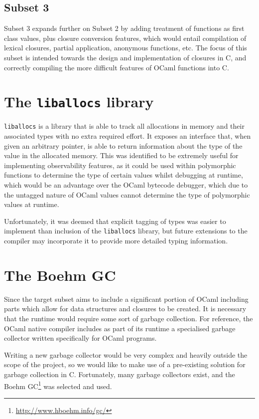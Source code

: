 \subsection{Subset 3}

Subset 3 expands further on Subset 2 by adding treatment of functions as first
class values, plus closure conversion features, which would entail compilation
of lexical closures, partial application, anonymous functions, etc. The focus of
this subset is intended towards the design and implementation of closures in C,
and correctly compiling the more difficult features of OCaml functions into C.

\section{The \texttt{liballocs} library}

\texttt{liballocs}\cite{liballocs} is a library that is able to track all
allocations in memory and their associated types with no extra required effort.
It exposes an interface that, when given an arbitrary pointer, is able to return
information about the type of the value in the allocated memory. This was
identified to be extremely useful for implementing observability features, as it
could be used within polymorphic functions to determine the type of certain
values whilst debugging at runtime, which would be an advantage over the OCaml
bytecode debugger, which due to the untagged nature of OCaml values cannot
determine the type of polymorphic values at runtime.

Unfortunately, it was deemed that explicit tagging of types was easier to
implement than inclusion of the \texttt{liballocs} library, but future
extensions to the compiler may incorporate it to provide more detailed typing
information.

\section{The Boehm GC}

Since the target subset aims to include a significant portion of OCaml including
parts which allow for data structures and closures to be created. It is
necessary that the runtime would require some sort of garbage collection. For
reference, the OCaml native compiler includes as part of its runtime a
specialised garbage collector written specifically for OCaml programs.

Writing a new garbage collector would be very complex and heavily outside the
scope of the project, so we would like to make use of a pre-existing solution
for garbage collection in C. Fortunately, many garbage collectors exist, and the
Boehm GC\footnote{\url{http://www.hboehm.info/gc/}} was selected and used.

